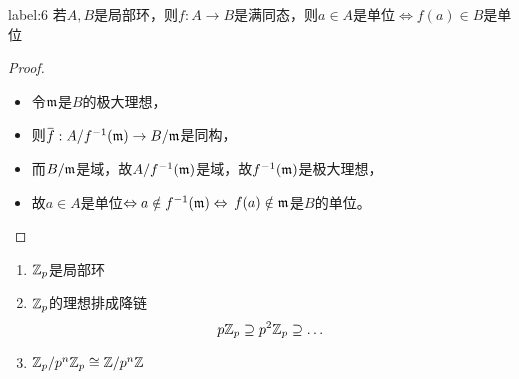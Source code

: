 \documentclass[11pt]{article}
\begin{document}
\begin{lemma}[]
label:6
若\(A,B\)是局部环，则\(f:A\to B\)是满同态，则\(a\in A\)是单位\(\Leftrightarrow f(a)\in B\)是单位
\end{lemma}

\begin{proof}
\begin{itemize}
\item 令\(\mathfrak{m}\)是\(B\)的极大理想，
\item 则\(\barf:A/f^{-1}(\fm)\to B/\fm\)是同构，
\item 而\(B/\mathfrak{m}\)是域，故\(A/f^{-1}(\mathfrak{m})\)是域，故\(f^{-1}(\mathfrak{m})\)是极大理想，
\item 故\(a\in A\)是单位\(\Leftrightarrow a\notin f^{-1}(\mathfrak{m}) \Leftrightarrow\) \(f(a)\notin\mathfrak{m}\)是\(B\)的单位。
\end{itemize}
\end{proof}

\begin{proposition}[]
\begin{enumerate}
\item \(\mathbb{Z}_p\)是局部环
\item \(\mathbb{Z}_p\)的理想排成降链
\begin{equation*}
p\mathbb{Z}_p\supseteq p^2\mathbb{Z}_p\supseteq\dots
\end{equation*}
\item \(\mathbb{Z}_p/p^n\mathbb{Z}_p\cong\mathbb{Z}/p^n\mathbb{Z}\)
\end{enumerate}
\end{proposition}
\end{document}
